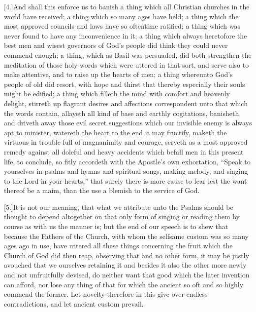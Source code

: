 [4.]And shall this enforce us to banish a thing which all Christian churches in the world have received; a thing which so many ages have held; a thing which the most approved councils and laws have so oftentime ratified; a thing which was never found to have any inconvenience in it; a thing which always heretofore the best men and wisest governors of God’s people did think they could never commend  enough;
 a thing, which as Basil was persuaded, did both strengthen the meditation of those holy words which were uttered in that sort, and serve also to make attentive, and to raise up the hearts of men; a thing whereunto God’s people of old did resort, with hope and thirst that thereby especially their souls might be edified; a thing which filleth the mind with comfort and heavenly delight, stirreth up flagrant desires and affections correspondent unto that which the words contain, allayeth all kind of base and earthly cogitations, banisheth and driveth away those evil secret suggestions which our invisible enemy is always apt to minister, watereth the heart to the end it may fructify, maketh the virtuous in trouble full of magnanimity and courage, serveth as a most approved remedy against all doleful and heavy accidents which befall men in this present life, to conclude, so fitly accordeth with the Apostle’s own exhortation, “Speak to yourselves in psalms and hymns and spiritual songs, making melody, and singing to the Lord in your hearts,” that surely there is more cause to fear lest the want thereof be a maim, than the use a blemish to the service of God.

[5.]It is not our meaning, that what we attribute unto the Psalms should be thought to depend altogether on that only form of singing or reading them by course as with us the manner is; but the end of our speech is to shew that because the Fathers of the Church, with whom the selfsame custom was so many ages ago in use, have uttered all these things concerning the fruit which the Church of God did then reap, observing that and no other form, it may be justly avouched that we ourselves retaining it and besides it also the other more newly and not unfruitfully devised, do neither want that good which the later invention can afford, nor lose any thing of that for which the ancient so oft and so highly commend the former. Let novelty therefore in this give over endless contradictions, and let ancient custom prevail.


